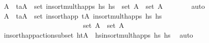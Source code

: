 \begin{isabellebody}
\ A{\isacharprime}{\kern0pt}\ \ {\isachardoublequoteopen}{\isacharparenleft}{\kern0pt}t\isactrlsub a{\isacharcomma}{\kern0pt}A{\isacharprime}{\kern0pt}{\isacharparenright}{\kern0pt}\ {\isasymin}\ set\ {\isacharparenleft}{\kern0pt}insort{\isacharunderscore}{\kern0pt}mult{\isacharunderscore}{\kern0pt}happs\ hs\ hs\ \ {\isachardoublequoteopen}set\ A\ {\isasymsubseteq}\ set\ A{\isacharprime}{\kern0pt}{\isachardoublequoteclose}\isanewline
\ \ \ \ \ \ \isamarkupfalse%
\ auto\isanewline
\ \ \ \ \isamarkupfalse%
\ \isamarkupfalse%
\ A{\isacharprime}{\kern0pt}{\isacharprime}{\kern0pt}\ \ {\isachardoublequoteopen}{\isacharparenleft}{\kern0pt}t\isactrlsub a{\isacharcomma}{\kern0pt}A{\isacharprime}{\kern0pt}{\isacharprime}{\kern0pt}{\isacharparenright}{\kern0pt}\ {\isasymin}\ set\ {\isacharparenleft}{\kern0pt}insort{\isacharunderscore}{\kern0pt}happ\ {\isacharparenleft}{\kern0pt}tA\ {\isacharparenleft}{\kern0pt}insort{\isacharunderscore}{\kern0pt}mult{\isacharunderscore}{\kern0pt}happs\ hs\ hs\ \isanewline
\ \ \ \ \ \ \ \ \ \ \ \ \ \ \ \ \ \ \ \ \ \ \ \ {\isachardoublequoteopen}set\ A{\isacharprime}{\kern0pt}\ {\isasymsubseteq}\ set\ A{\isacharprime}{\kern0pt}{\isacharprime}{\kern0pt}{\isachardoublequoteclose}\isanewline
\ \ \ \ \ \ \isamarkupfalse%
\ insort{\isacharunderscore}{\kern0pt}happ{\isacharunderscore}{\kern0pt}action{\isacharunderscore}{\kern0pt}subset{\isacharbrackleft}{\kern0pt}\ h{\isacharequal}{\kern0pt}{\isachardoublequoteopen}{\isacharparenleft}{\kern0pt}tA\ \ hs{\isacharequal}{\kern0pt}{\isachardoublequoteopen}insort{\isacharunderscore}{\kern0pt}mult{\isacharunderscore}{\kern0pt}happs\ hs\ hs\ \isamarkupfalse%
\ auto\isanewline
\ \ \ \ \isamarkupfalse%
\ \isamarkupfalse%

\end{isabellebody}
